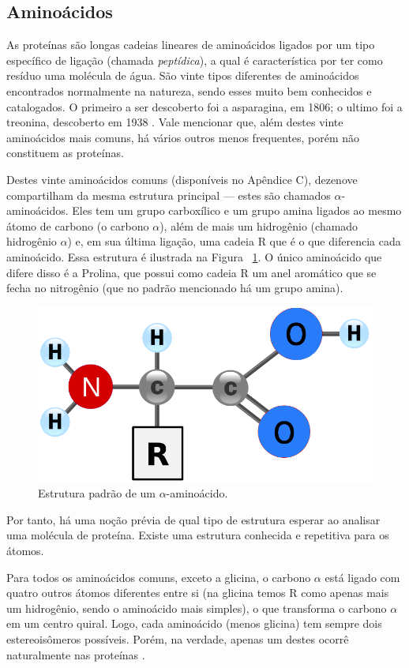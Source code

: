 \documentclass[a4paper,12pt]{article}
\begin{document}
	\subsection{Aminoácidos}
	As proteínas são longas cadeias lineares de aminoácidos ligados por um tipo específico de ligação (chamada \textit{peptídica}), a qual é característica por ter como resíduo uma molécula de água. São vinte tipos diferentes de aminoácidos encontrados normalmente na natureza, sendo esses muito bem conhecidos e catalogados. O primeiro a ser descoberto foi a asparagina, em 1806; o ultimo foi a treonina, descoberto em 1938 \cite{bioquimicaLehninger}. Vale mencionar que, além destes vinte aminoácidos mais comuns, há vários outros menos frequentes, porém não constituem as proteínas.
	
	Destes vinte aminoácidos comuns (disponíveis no Apêndice C), dezenove compartilham da mesma estrutura principal \cite{fidalgotese} --- estes são chamados $\alpha$-aminoácidos. Eles tem um grupo carboxílico e um grupo amina ligados ao mesmo átomo de carbono (o carbono $\alpha$), além de mais um hidrogênio (chamado hidrogênio $\alpha$) e, em sua última ligação, uma cadeia R que é o que diferencia cada aminoácido. Essa estrutura é ilustrada na Figura ~\ref{fig:amino}. O único aminoácido que difere disso é a Prolina, que possui como cadeia R um anel aromático que se fecha no nitrogênio (que no padrão mencionado há um grupo amina).
	
	\begin{figure}[H]
		\begin{center}
			\includegraphics[width=0.35\linewidth]{amino.png}
		\end{center}
		\caption{Estrutura padrão de um $\alpha$-aminoácido.}
		\label{fig:amino}
	\end{figure}
	
	Por tanto, há uma noção prévia de qual tipo de estrutura esperar ao analisar uma molécula de proteína. Existe uma estrutura conhecida e repetitiva para os átomos.
	
	Para todos os aminoácidos comuns, exceto a glicina, o carbono $\alpha$ está ligado com quatro outros átomos diferentes entre si (na glicina temos R como apenas mais um hidrogênio, sendo o aminoácido mais simples), o que transforma o carbono $\alpha$ em um centro quiral. Logo, cada aminoácido (menos glicina) tem sempre dois estereoisômeros possíveis. Porém, na verdade, apenas um destes ocorrê naturalmente nas proteínas \cite{bioquimicaLehninger}.
	
\end{document}
